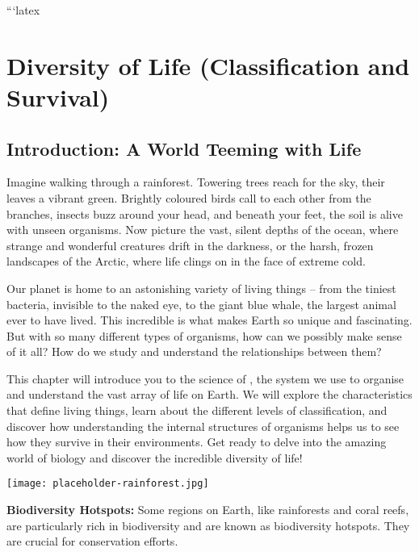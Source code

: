 ```latex
\chapter{Diversity of Life (Classification and Survival)}

\section{Introduction: A World Teeming with Life}

Imagine walking through a rainforest. Towering trees reach for the sky, their leaves a vibrant green. Brightly coloured birds call to each other from the branches, insects buzz around your head, and beneath your feet, the soil is alive with unseen organisms. Now picture the vast, silent depths of the ocean, where strange and wonderful creatures drift in the darkness, or the harsh, frozen landscapes of the Arctic, where life clings on in the face of extreme cold.

Our planet is home to an astonishing variety of living things – from the tiniest bacteria, invisible to the naked eye, to the giant blue whale, the largest animal ever to have lived. This incredible  is what makes Earth so unique and fascinating.  But with so many different types of organisms, how can we possibly make sense of it all? How do we study and understand the relationships between them?

This chapter will introduce you to the science of , the system we use to organise and understand the vast array of life on Earth. We will explore the characteristics that define living things, learn about the different levels of classification, and discover how understanding the internal structures of organisms helps us to see how they survive in their environments.  Get ready to delve into the amazing world of biology and discover the incredible diversity of life!

\begin{marginfigure}
\texttt{[image: placeholder-rainforest.jpg]}
\end{marginfigure}

\begin{marginnote}
\textbf{Biodiversity Hotspots:} Some regions on Earth, like rainforests and coral reefs, are particularly rich in biodiversity and are known as biodiversity hotspots. They are crucial for conservation efforts.
\end{marginnote}


